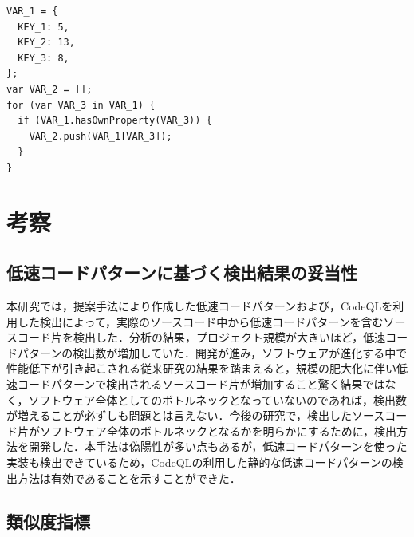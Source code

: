 \documentclass[submit,techrep,noauthor]{ipsj}
\newcommand{\memo}[1]{\colorbox{magenta!30}{{\bf MEMO}:}{\color{red!50} {\textbf{[#1]}}}}
\begin{document}
\begin{lstlisting}[caption=マイクロベンチマークにおける類似度の高い検出例, label=MB_highcos, captionpos=t, columns=flexible]
VAR_1 = {
  KEY_1: 5,
  KEY_2: 13,
  KEY_3: 8,
};
var VAR_2 = [];
for (var VAR_3 in VAR_1) {
  if (VAR_1.hasOwnProperty(VAR_3)) {
    VAR_2.push(VAR_1[VAR_3]);
  }
}
\end{lstlisting}


\section{考察}
\label{sec:discussion}


\subsection{低速コードパターンに基づく検出結果の妥当性}

本研究では，提案手法により作成した低速コードパターンおよび，CodeQLを利用した検出によって，実際のソースコード中から低速コードパターンを含むソースコード片を検出した．分析の結果，プロジェクト規模が大きいほど，低速コードパターンの検出数が増加していた．開発が進み，ソフトウェアが進化する中で性能低下が引き起こされる従来研究\cite{emprical_perfomancebug}の結果を踏まえると，規模の肥大化に伴い低速コードパターンで検出されるソースコード片が増加すること驚く結果ではなく，ソフトウェア全体としてのボトルネックとなっていないのであれば，検出数が増えることが必ずしも問題とは言えない．今後の研究で，検出したソースコード片がソフトウェア全体のボトルネックとなるかを明らかにするために，検出方法を開発した．本手法は偽陽性が多い点もあるが，低速コードパターンを使った実装も検出できているため，CodeQLの利用した静的な低速コードパターンの検出方法は有効であることを示すことができた．




\subsection{類似度指標}
\end{document}

